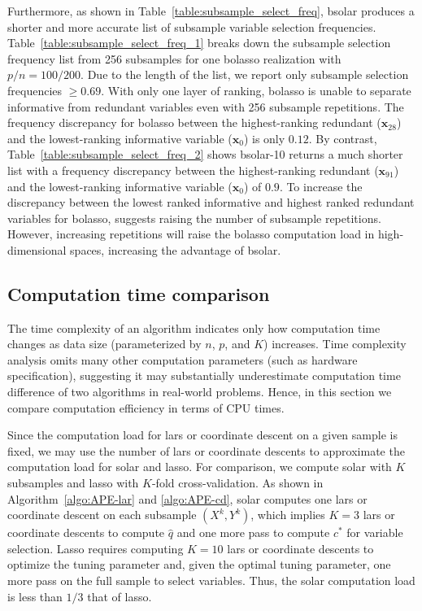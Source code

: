 \documentclass[11pt,review,authoryear]{elsarticle}
\begin{document}
Furthermore, as shown in Table~\ref{table:subsample_select_freq}, bsolar produces a shorter and more accurate list of subsample variable selection frequencies. Table~\ref{table:subsample_select_freq_1} breaks down the subsample selection frequency list from 256 subsamples for one bolasso realization with $p/n=100/200$. Due to the length of the list, we report only subsample selection frequencies $\ge0.69$. With only one layer of ranking, bolasso is unable to separate informative from redundant variables even with 256 subsample repetitions. The frequency discrepancy for bolasso between the highest-ranking redundant ($\mathbf{x}_{28}$) and the lowest-ranking informative variable ($\mathbf{x}_0$) is only $0.12$. By contrast, Table~\ref{table:subsample_select_freq_2} shows bsolar-10 returns a much shorter list with a frequency discrepancy between the highest-ranking redundant ($\mathbf{x}_{91}$) and the lowest-ranking informative variable ($\mathbf{x}_0$) of $0.9$. To increase the discrepancy between the lowest ranked informative and highest ranked redundant variables for bolasso, \citet{bach2008bolasso} suggests raising the number of subsample repetitions. However, increasing repetitions will raise the bolasso computation load in high-dimensional spaces, increasing the advantage of bsolar.

\subsection{Computation time comparison \label{subsection:comp}}

The time complexity of an algorithm indicates only how computation time changes as data size (parameterized by $n$, $p$, and $K$) increases. Time complexity analysis omits many other computation parameters (such as hardware specification), suggesting it may substantially underestimate computation time difference of two algorithms in real-world problems. Hence, in this section we compare computation efficiency in terms of CPU times.

Since the computation load for lars or coordinate descent on a given sample is fixed, we may use the number of lars or coordinate descents to approximate the computation load for solar and lasso. For comparison, we compute solar with $K$ subsamples and lasso with $K$-fold cross-validation. As shown in Algorithm~\ref{algo:APE-lar} and \ref{algo:APE-cd}, solar computes one lars or coordinate descent on each subsample $(X^k, Y^k)$, which implies $K=3$ lars or coordinate descents to compute $\widehat{q}$ and one more pass to compute $c^*$ for variable selection. Lasso requires computing $K=10$ lars or coordinate descents to optimize the tuning parameter and, given the optimal tuning parameter, one more pass on the full sample to select variables. Thus, the solar computation load is less than $1/3$ that of lasso.
\end{document}
